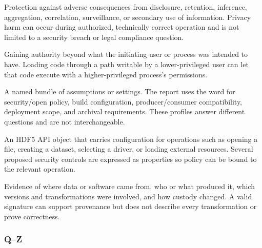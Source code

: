 \documentclass[../main.tex]{subfiles}
\begin{document}
\begin{description}[leftmargin=1.5em,style=nextline]
\item[Privacy.]
Protection against adverse consequences from disclosure, retention, inference,
aggregation, correlation, surveillance, or secondary use of information.
Privacy harm can occur during authorized, technically correct operation and is
not limited to a security breach or legal compliance question.

\item[Privilege escalation.]
Gaining authority beyond what the initiating user or process was intended to
have. Loading code through a path writable by a lower-privileged user can let
that code execute with a higher-privileged process's permissions.

\item[Profile.]
A named bundle of assumptions or settings. The report uses the word for
security/open policy, build configuration, producer/consumer compatibility,
deployment scope, and archival requirements. These profiles answer different
questions and are not interchangeable.

\item[Property list.]
An HDF5 API object that carries configuration for operations such as opening a
file, creating a dataset, selecting a driver, or loading external resources.
Several proposed security controls are expressed as properties so policy can
be bound to the relevant operation.

\item[Provenance.]
Evidence of where data or software came from, who or what produced it, which
versions and transformations were involved, and how custody changed. A valid
signature can support provenance but does not describe every transformation or
prove correctness.

\end{description}

\subsubsection{Q--Z}
\label{glossary:qz}
\end{document}
